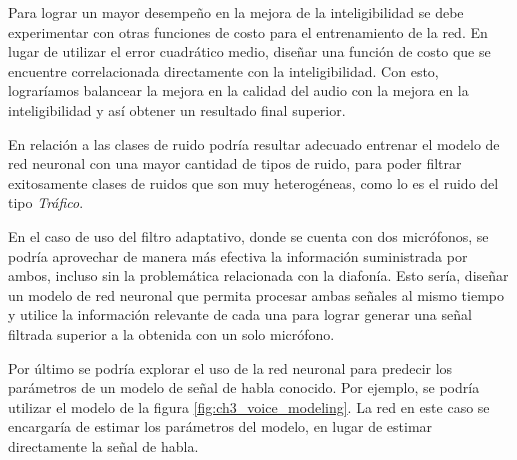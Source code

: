 Para lograr un mayor desempeño en la mejora de la inteligibilidad se debe experimentar con otras funciones de costo para el entrenamiento de la red. En lugar de utilizar el error cuadrático medio, diseñar una función de costo que se encuentre correlacionada directamente con la inteligibilidad. Con esto, lograríamos balancear la mejora en la calidad del audio con la mejora en la inteligibilidad y así obtener un resultado final superior.

En relación a las clases de ruido podría resultar adecuado entrenar el modelo de red neuronal con una mayor cantidad de tipos de ruido, para poder filtrar exitosamente clases de ruidos que son muy heterogéneas, como lo es el ruido del tipo \emph{Tráfico}.

En el caso de uso del filtro adaptativo, donde se cuenta con dos micrófonos, se podría aprovechar de manera más efectiva la información suministrada por ambos, incluso sin la problemática relacionada con la diafonía. Esto sería, diseñar un modelo de red neuronal que permita procesar ambas señales al mismo tiempo y utilice la información relevante de cada una para lograr generar una señal filtrada superior a la obtenida con un solo micrófono.

Por último se podría explorar el uso de la red neuronal para predecir los parámetros de un modelo de señal de habla conocido. Por ejemplo, se podría utilizar el modelo de la figura \ref{fig:ch3_voice_modeling}. La red en este caso se encargaría de estimar los parámetros del modelo, en lugar de estimar directamente la señal de habla.